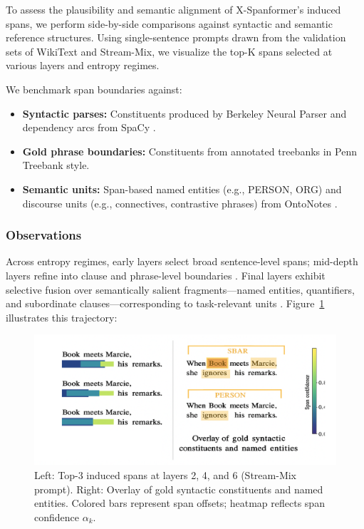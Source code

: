 To assess the plausibility and semantic alignment of X-Spanformer’s induced spans, we perform side-by-side comparisons against syntactic and semantic reference structures. Using single-sentence prompts drawn from the validation sets of WikiText and Stream-Mix, we visualize the top-K spans selected at various layers and entropy regimes.

We benchmark span boundaries against:

\begin{itemize}[leftmargin=1.5em]
  \item \textbf{Syntactic parses:} Constituents produced by Berkeley Neural Parser \cite{kitaev2018constituency} and dependency arcs from SpaCy \cite{honnibal2017spacy}.
  \item \textbf{Gold phrase boundaries:} Constituents from annotated treebanks in Penn Treebank style.
  \item \textbf{Semantic units:} Span-based named entities (e.g., PERSON, ORG) and discourse units (e.g., connectives, contrastive phrases) from OntoNotes \cite{weischedel2013ontonotes}.
\end{itemize}






\subsubsection*{Observations}

Across entropy regimes, early layers select broad sentence-level spans; mid-depth layers refine into clause and phrase-level boundaries \cite{kitaev2018constituency}. Final layers exhibit selective fusion over semantically salient fragments—named entities, quantifiers, and subordinate clauses—corresponding to task-relevant units \cite{weischedel2013ontonotes, honnibal2017spacy}. Figure~\ref{fig:span_alignment_viz} illustrates this trajectory:

\begin{figure}[H]
  \centering
  \includegraphics[width=\textwidth]{figures/figure_8.png}
  \caption{Left: Top-3 induced spans at layers 2, 4, and 6 (Stream-Mix prompt). Right: Overlay of gold syntactic constituents and named entities. Colored bars represent span offsets; heatmap reflects span confidence \(\alpha_k\).}
  \label{fig:span_alignment_viz}
\end{figure}

